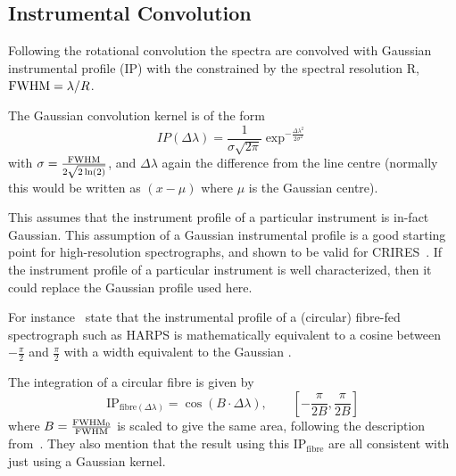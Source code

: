 {\subsection{Instrumental Convolution}
Following the rotational convolution the spectra are convolved with Gaussian instrumental profile ({\textrm{IP}}) with the {\fwhm}  constrained by the spectral resolution R, $\textrm{FWHM}= \lambda/R$.

The Gaussian convolution kernel is of the form
\begin{equation}
IP(\Delta\lambda) = \frac{1}{\sigma \sqrt{2\pi}} \exp^{-\frac{{\Delta\lambda}^{2}}{2 {\sigma}^{2}}}
\label{eqn:IP_profile}
\end{equation}
with $\sigma = \frac{\textrm{FWHM}}{2\sqrt{2 \ln(2)}}$, and $\Delta \lambda$ again the difference from the line centre (normally this would be written as $(x-\mu)$ where $\mu$ is the Gaussian centre).

This assumes that the instrument profile of a particular instrument is in-fact Gaussian.
This assumption of a Gaussian instrumental profile is a good starting point for high-resolution spectrographs, and shown to be valid for CRIRES~\citep{seifahrt_synthesising_2010}.
If the instrument profile of a particular instrument is well characterized, then it could replace the Gaussian profile used here.

For instance~\citet{artigau_optical_2018}  state that the instrumental profile of a (circular) fibre-fed spectrograph such as {HARPS} is mathematically equivalent to a cosine between $-\frac{\pi}{2}$ and $\frac{\pi}{2}$ with a width equivalent to the Gaussian {\fwhm}.

The integration of a circular fibre is given by
\begin{equation}
\textrm{IP}_{\textrm{fibre}(\Delta\lambda)} = \cos(B\cdot\Delta\lambda) ,  \hspace{2em} [-\frac{\pi}{2 B}, \frac{\pi}{2 B}]
\end{equation}
where {$B = \frac{\textrm{FWHM}_{0}}{\textrm{FWHM}}$ } is scaled to give the same area,
following the description from~\citet{artigau_optical_2018}.
They also mention that the result using this $\textrm{IP}_{\textrm{fibre}}$ are all consistent with just using a Gaussian kernel.

}

